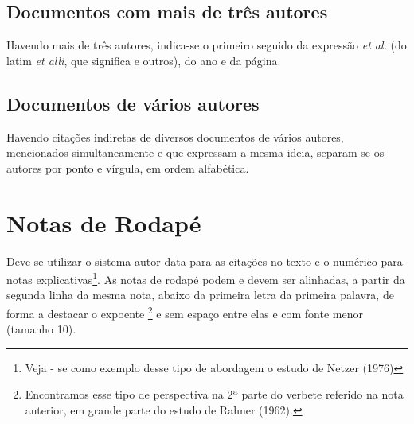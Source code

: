 

\subsection{Documentos com mais de três autores}
Havendo mais de três autores, indica-se o primeiro seguido da expressão \textit{et al.} (do latim \textit{et alli}, que significa e outros), do ano e da página.



\subsection{Documentos de vários autores}

Havendo    citações    indiretas de    diversos    documentos    de    vários    autores, mencionados  simultaneamente e  que  expressam  a  mesma  ideia,  separam-se  os  autores  por ponto e vírgula, em ordem alfabética.

\section{Notas de Rodap\'{e}}

Deve-se utilizar o sistema autor-data para as  citações no texto e o numérico para notas explicativas\footnote{Veja - se como exemplo desse tipo de abordagem o estudo de Netzer (1976)}. As notas de rodapé podem e devem ser alinhadas, a partir da segunda linha da mesma nota, abaixo da primeira letra da primeira palavra, de forma a destacar o expoente \footnote{Encontramos  esse  tipo  de  perspectiva  na  2ª  parte  do  verbete  referido  na  nota  anterior,  em  grande  parte  do estudo de Rahner (1962).} e sem espaço entre elas e com fonte menor (tamanho 10).

